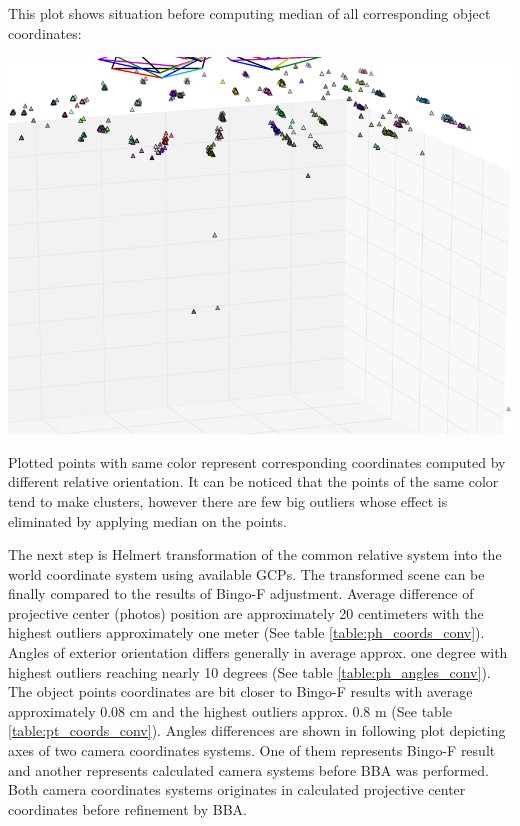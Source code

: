 \documentclass[a4paper,12pt]{article}
\begin{document}

This plot shows situation before computing median of all corresponding object coordinates:

\includegraphics[scale=0.5]{figures/before_median.png}

Plotted points with same color represent corresponding coordinates computed by different relative orientation. It can be noticed that 
the points of the same color tend to make clusters, however there are few big outliers whose effect is eliminated by applying
median on the points.

The next step is Helmert transformation of the common relative system into the world coordinate system using available GCPs.
The transformed scene can be finally compared to the results of Bingo-F adjustment.
Average difference of projective center (photos) position are approximately 20 centimeters with the highest outliers approximately one meter 
(See table \ref{table:ph_coords_conv}). Angles of exterior orientation differs  generally in average approx. one degree with 
highest outliers reaching nearly 10 degrees (See table \ref{table:ph_angles_conv}). 
The object points coordinates 
are bit closer to Bingo-F results with average approximately 0.08 cm and the highest outliers approx. 0.8 m (See table \ref{table:pt_coords_conv}). 
Angles differences are shown in following plot depicting axes of two camera coordinates systems. One of them represents 
Bingo-F result and another represents
 calculated camera systems before BBA was performed. Both camera coordinates systems originates in calculated projective center coordinates
  before refinement by BBA.
    
\end{document}
